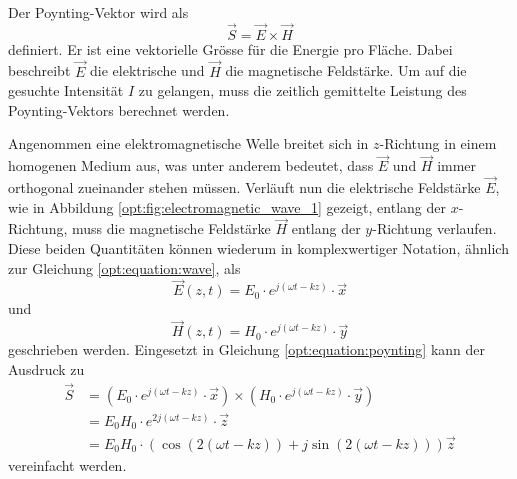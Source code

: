 Der Poynting-Vektor wird als
\begin{equation}
\vec{S} = \vec{E} \times \vec{H}
\label{opt:equation:poynting}
\end{equation}
definiert.
Er ist eine vektorielle Grösse für die Energie pro Fläche.
Dabei beschreibt $\vec{E}$ die elektrische und $\vec{H}$ die magnetische Feldstärke.
Um auf die gesuchte Intensität $I$ zu gelangen, muss die zeitlich gemittelte Leistung des Poynting-Vektors berechnet werden.

Angenommen eine elektromagnetische Welle breitet sich in $z$-Richtung in einem homogenen Medium aus, was unter anderem bedeutet, dass $\vec{E}$ und $\vec{H}$ immer orthogonal zueinander stehen müssen.
Verläuft nun die elektrische Feldstärke $\vec{E}$, wie in Abbildung \ref{opt:fig:electromagnetic_wave_1} gezeigt, entlang der $x$-Richtung, muss die magnetische Feldstärke $\vec{H}$ entlang der $y$-Richtung verlaufen.
Diese beiden Quantitäten können wiederum in komplexwertiger Notation, ähnlich zur Gleichung \eqref{opt:equation:wave}, als
\begin{equation}
\vec{E}(z,t)
=
E_0 \cdot e^{j(\omega t-k z)} \cdot \vec{x}
\label{opt:equation:wave_electric_field}
\end{equation}
und
\begin{equation}
\vec{H}(z,t)
=
H_0 \cdot e^{j(\omega t-k z)} \cdot \vec{y}
\label{opt:equation:wave_magnetic_field}
\end{equation}
geschrieben werden.
Eingesetzt in Gleichung \eqref{opt:equation:poynting} kann der Ausdruck zu
\begin{align*}
\vec{S}
&=
\left(E_0 \cdot e^{j(\omega t-k z)} \cdot \vec{x}\right) \times \left(H_0 \cdot e^{j(\omega t-k z)} \cdot \vec{y}\right)
\\
&=
E_0 H_0 \cdot e^{2j(\omega t-k z)} \cdot \vec{z}
\\
&=
E_0 H_0 \cdot \left(\cos{(2(\omega t-kz))}+j\sin{(2(\omega t-kz))}\right) \vec{z}
\end{align*}
vereinfacht werden.

